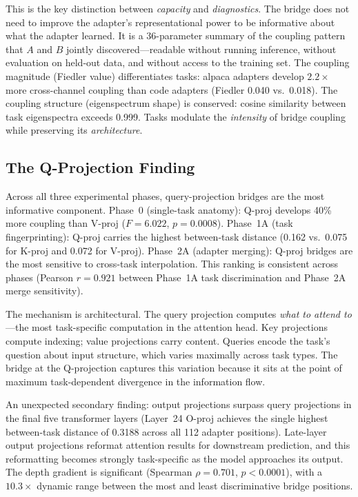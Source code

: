 This is the key distinction between \emph{capacity} and
\emph{diagnostics}. The bridge does not need to improve the adapter's
representational power to be informative about what the adapter
learned. It is a 36-parameter summary of the coupling pattern that
$A$ and $B$ jointly discovered---readable without running inference,
without evaluation on held-out data, and without access to the
training set. The coupling magnitude (Fiedler value) differentiates
tasks: alpaca adapters develop $2.2\times$ more cross-channel
coupling than code adapters (Fiedler 0.040 vs.\ 0.018). The coupling
structure (eigenspectrum shape) is conserved: cosine similarity
between task eigenspectra exceeds 0.999. Tasks modulate the
\emph{intensity} of bridge coupling while preserving its
\emph{architecture}.

\subsection{The Q-Projection Finding}

Across all three experimental phases, query-projection bridges are
the most informative component. Phase~0 (single-task anatomy):
Q-proj develops 40\% more coupling than V-proj ($F = 6.022$,
$p = 0.0008$). Phase~1A (task fingerprinting): Q-proj carries the
highest between-task distance (0.162 vs.\ 0.075 for K-proj and
0.072 for V-proj). Phase~2A (adapter merging): Q-proj bridges are
the most sensitive to cross-task interpolation. This ranking is
consistent across phases (Pearson $r = 0.921$ between Phase~1A task
discrimination and Phase~2A merge sensitivity).

The mechanism is architectural. The query projection computes
\emph{what to attend to}---the most task-specific computation in
the attention head. Key projections compute indexing; value
projections carry content. Queries encode the task's question about
input structure, which varies maximally across task types. The bridge
at the Q-projection captures this variation because it sits at the
point of maximum task-dependent divergence in the information flow.

An unexpected secondary finding: output projections surpass query
projections in the final five transformer layers (Layer~24 O-proj
achieves the single highest between-task distance of 0.3188 across
all 112 adapter positions). Late-layer output projections reformat
attention results for downstream prediction, and this reformatting
becomes strongly task-specific as the model approaches its output.
The depth gradient is significant (Spearman $\rho = 0.701$,
$p < 0.0001$), with a $10.3\times$ dynamic range between the most
and least discriminative bridge positions.

